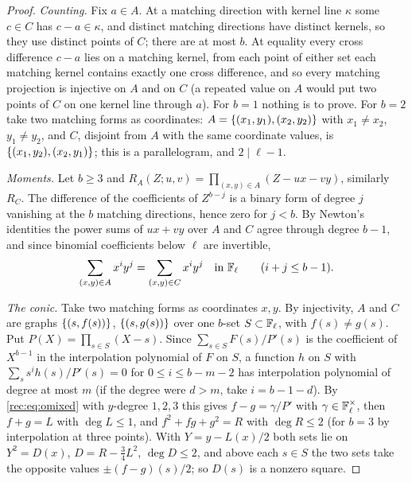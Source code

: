 \begin{proof}
\emph{Counting.} Fix $a\in A$. At a matching direction with kernel line $\kappa$ some $c\in C$ has $c-a\in\kappa$, and
distinct matching directions have distinct kernels, so they use distinct points of $C$; there are at
most $b$. At equality every cross difference $c-a$ lies on a matching kernel, from each point of either
set each matching kernel contains exactly one cross difference, and so every matching projection is
injective on $A$ and on $C$ (a repeated value on $A$ would put two points of $C$ on one kernel line through
$a$). For $b=1$ nothing is to prove. For $b=2$ take two matching forms as coordinates: $A=\{(x_1,y_1),(x_2,y_2)\}$
with $x_1\ne x_2$, $y_1\ne y_2$, and $C$, disjoint from $A$ with the same coordinate values, is $\{(x_1,y_2),(x_2,y_1)\}$; this
is a parallelogram, and $2\mid\ell-1$.

\emph{Moments.} Let $b\ge3$ and $R_A(Z;u,v)=\prod_{(x,y)\in A}(Z-ux-vy)$, similarly $R_C$. The difference of the
coefficients of $Z^{b-j}$ is a binary form of degree $j$ vanishing at the $b$ matching directions, hence zero
for $j<b$. By Newton's identities the power sums of $ux+vy$ over $A$ and $C$ agree through degree $b-1$, and
since binomial coefficients below $\ell$ are invertible,
\begin{equation}\label{rec:eq:omixed}
 \sum_{(x,y)\in A}x^iy^j=\sum_{(x,y)\in C}x^iy^j\quad\text{in }\mathbb{F}_\ell\qquad(i+j\le b-1).
\end{equation}

\emph{The conic.} Take two matching forms as coordinates $x,y$. By injectivity, $A$ and $C$ are graphs
$\{(s,f(s))\}$, $\{(s,g(s))\}$ over one $b$-set $S\subset\mathbb{F}_\ell$, with $f(s)\ne g(s)$. Put $P(X)=\prod_{s\in S}(X-s)$. Since
$\sum_{s\in S}F(s)/P'(s)$ is the coefficient of $X^{b-1}$ in the interpolation polynomial of $F$ on $S$, a function
$h$ on $S$ with $\sum_ss^ih(s)/P'(s)=0$ for $0\le i\le b-m-2$ has interpolation polynomial of degree at most $m$
(if the degree were $d>m$, take $i=b-1-d$). By \eqref{rec:eq:omixed} with $y$-degree $1,2,3$ this gives
$f-g=\gamma/P'$ with $\gamma\in\mathbb{F}_\ell^\times$, then $f+g=L$ with $\deg L\le1$, and $f^2+fg+g^2=R$ with $\deg R\le2$ (for $b=3$ by
interpolation at three points). With $Y=y-L(x)/2$ both sets lie on $Y^2=D(x)$, $D=R-\tfrac34L^2$, $\deg D\le2$, and
above each $s\in S$ the two sets take the opposite values $\pm(f-g)(s)/2$; so $D(s)$ is a nonzero square.


\end{proof}
